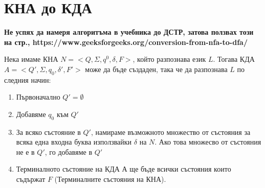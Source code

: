 \documentclass[11pt]{article} %
\begin{document}
\section{КНА до КДА}
\textbf{Не успях да намеря алгоритъма в учебника до ДСТР, затова ползвах този на стр., https://www.geeksforgeeks.org/conversion-from-nfa-to-dfa/}

Нека имаме КНА $N = <Q, \Sigma, q^{0}, \delta, F>$, който разпознава език $L$. Тогава КДА $A = <Q', \Sigma, q_{0}, \delta', F'>$ може да бъде създаден, така че да разпознава $L$ по следния начин: \\

\renewcommand{\theenumi}{\arabic{enumi}}
\begin{enumerate}
	\item Първоначално $Q' = \emptyset$\\
	\item Добавяме $q_{0}$ към $Q'$\\
	\item За всяко състояние в $Q'$, намираме възможното множество от състояния за всяка една входна буква използвайки $\delta$ на $N$. Ако това множесво от състояния не е в $Q'$, го добавяме в $Q'$\\
	\item Терминалното състояние на КДА $А$ ще бъде всички състояния които съдържат $F$ (Терминалните състояния на КНА).
\end{enumerate}
\end{document}
